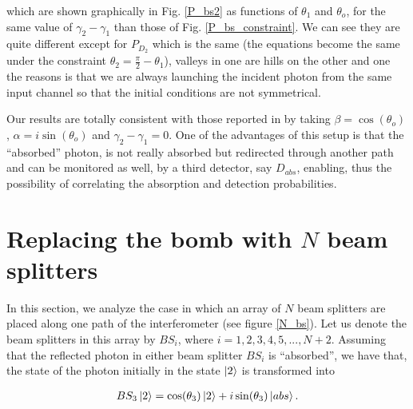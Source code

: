\documentclass[12pt]{book}
\begin{document}
which are shown graphically in Fig. \ref{P_bs2} as functions of $\theta_{1}$ and $\theta_{o}$, for the same value of  $\gamma_{2}-\gamma_{1}$ than those of Fig. \ref{P_bs_constraint}. We can see they are quite different except for $P_{D_{2}}$ which is the same (the equations become the same under the constraint $\theta_{2}=\frac{\pi}{2}-\theta_{1}$), valleys in one are hills on the other and one the reasons is that we are always launching the incident photon from the same input channel so that the initial conditions are not symmetrical.




Our results are totally consistent with those reported in \cite{zuri,azuri} by taking $\beta=\cos(\theta_{o})$, $\alpha=i \sin(\theta_{o})$ and $\gamma_{2}-\gamma_{1}=0$. One of the advantages of this setup is that the ``absorbed'' photon, is not really absorbed but redirected through another path and can be monitored as well, by a third detector, say $D_{abs}$, enabling, thus the possibility of correlating the absorption and detection probabilities.

\section{Replacing the bomb with $N$ beam splitters }





In this section, we analyze the case in which an array of $N$ beam splitters are placed along one path of the interferometer (see figure \ref{N_bs}). Let us denote the beam splitters in this array by $BS_{i}$, where $i=1,2,3,4,5,...,N+2$. Assuming that the reflected photon in either beam splitter $BS_{i}$ is ``absorbed'', we have that, the state of the photon initially in the state $\ket{2}$ is transformed into

\begin{align}
BS_{3}\ket{2}=\cos(\theta_{3})\ket{2}+i\sin(\theta_{3})\ket{abs}.
\end{align}
\end{document}

